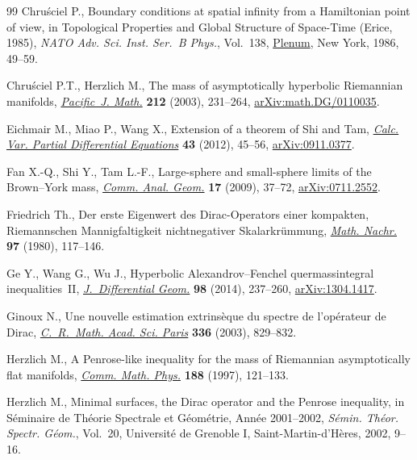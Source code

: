 \documentclass[pdftex]{sigma}
\numberwithin{equation}{section}
\begin{document}
\begin{thebibliography}{99}
Chru\'sciel P., Boundary conditions at spatial infinity from a {H}amiltonian
 point of view, in Topological Properties and Global Structure of Space-Time
 ({E}rice, 1985), \textit{NATO Adv. Sci. Inst. Ser.~B Phys.}, Vol.~138,
 \href{https://doi.org/10.1007/978-1-4899-3626-4_5}{Plenum}, New York, 1986, 49--59.

Chru\'sciel P.T., Herzlich M., The mass of asymptotically hyperbolic
 {R}iemannian manifolds, \href{https://doi.org/10.2140/pjm.2003.212.231}{\textit{Pacific~J. Math.}} \textbf{212} (2003),
 231--264, \href{https://arxiv.org/abs/math.DG/0110035}{arXiv:math.DG/0110035}.

Eichmair M., Miao P., Wang X., Extension of a theorem of {S}hi and {T}am,
 \href{https://doi.org/10.1007/s00526-011-0402-2}{\textit{Calc. Var. Partial Differential Equations}} \textbf{43} (2012),
 45--56, \href{https://arxiv.org/abs/0911.0377}{arXiv:0911.0377}.

Fan X.-Q., Shi Y., Tam L.-F., Large-sphere and small-sphere limits of the
 {B}rown--{Y}ork mass, \href{https://doi.org/10.4310/CAG.2009.v17.n1.a3}{\textit{Comm. Anal. Geom.}} \textbf{17} (2009), 37--72,
 \href{https://arxiv.org/abs/0711.2552}{arXiv:0711.2552}.

Friedrich Th., Der erste {E}igenwert des {D}irac-{O}perators einer kompakten,
 {R}iemannschen {M}annigfaltigkeit nichtnegativer {S}kalarkr\"ummung,
 \href{https://doi.org/10.1002/mana.19800970111}{\textit{Math. Nachr.}} \textbf{97} (1980), 117--146.

Ge Y., Wang G., Wu J., Hyperbolic {A}lexandrov--{F}enchel quermassintegral
 inequalities~{II}, \href{https://doi.org/10.4310/jdg/1406552250}{\textit{J.~Differential Geom.}} \textbf{98} (2014),
 237--260, \href{https://arxiv.org/abs/1304.1417}{arXiv:1304.1417}.

Ginoux N., Une nouvelle estimation extrins\`eque du spectre de l'op\'erateur de
 {D}irac, \href{https://doi.org/10.1016/S1631-073X(03)00206-1}{\textit{C.~R.~Math. Acad. Sci. Paris}} \textbf{336} (2003), 829--832.

Herzlich M., A {P}enrose-like inequality for the mass of {R}iemannian
 asymptotically flat manifolds, \href{https://doi.org/10.1007/s002200050159}{\textit{Comm. Math. Phys.}} \textbf{188}
 (1997), 121--133.

Herzlich M., Minimal surfaces, the {D}irac operator and the {P}enrose
 inequality, in S\'eminaire de {T}h\'eorie {S}pectrale et {G}\'eom\'etrie, {A}nn\'ee 2001--2002, \textit{S\'emin. Th\'eor. Spectr. G\'eom.}, Vol.~20,
 Universit\'e de Grenoble I, Saint-Martin-d'H\`eres, 2002, 9--16.


\end{thebibliography}
\end{document}
